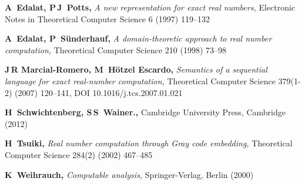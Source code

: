 \documentclass[microtype]{jloganal}
\theoremstyle{plain}
\theoremstyle{definition}
\begin{document}
\begin{thebibliography}{MRE07}
\textbf{A~Edalat, P\,J~Potts,}
\newblock \emph{A new representation for exact real numbers,} Electronic Notes in Theoretical Computer Science 6 (1997) 119--132

\textbf{A~Edalat, P~S{\"u}nderhauf,}
\newblock \emph{A domain-theoretic approach to real number computation,}
\newblock Theoretical Computer Science 210 (1998) 73--98


\textbf{J\,R Marcial-Romero, M~H\"otzel Escardo,}
\newblock \emph{Semantics of a sequential language for exact real-number computation,}
\newblock Theoretical Computer Science 379(1-2) (2007) 120--141, DOI 10.1016/j.tcs.2007.01.021

\textbf{H~Schwichtenberg, S\,S~Wainer.,}
 Cambridge University Press, Cambridge (2012)

\textbf{H~Tsuiki,}
\newblock \emph{Real number computation through Gray code embedding,}
\newblock Theoretical Computer Science 284(2) (2002) 467--485

\textbf{K~Weihrauch,}
\newblock \emph{Computable analysis,} Springer-Verlag, Berlin (2000)

\end{thebibliography}
\end{document}
